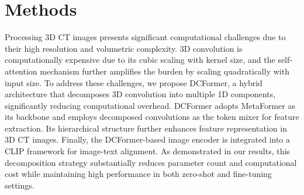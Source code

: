\section*{Methods}



Processing 3D CT images presents significant computational challenges due to their high resolution and volumetric complexity. 3D convolution is computationally expensive due to its cubic scaling with kernel size, and the self-attention mechanism further amplifies the burden by scaling quadratically with input size. To address these challenges, we propose DCFormer, a hybrid architecture that decomposes 3D convolution into multiple 1D components, significantly reducing computational overhead. DCFormer adopts MetaFormer \cite{yu2022metaformer, yu2023metaformer} as its backbone and employs decomposed convolutions as the token mixer for feature extraction. Its hierarchical structure further enhances feature representation in 3D CT images. Finally, the DCFormer-based image encoder is integrated into a CLIP framework for image-text alignment. As demonstrated in our results, this decomposition strategy substantially reduces parameter count and computational cost while maintaining high performance in both zero-shot and fine-tuning settings.


